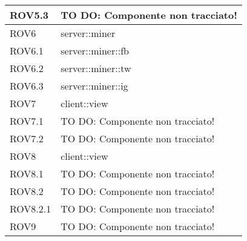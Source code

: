 \begin{center}
\begin{longtable}{| p{4cm} | p{8cm} |}
\hline
ROV5.3 & TO DO: Componente non tracciato! \\
\hline
ROV6 & server::miner \\
\hline
ROV6.1 & server::miner::fb \\
\hline
ROV6.2 & server::miner::tw \\
\hline
ROV6.3 & server::miner::ig \\
\hline
ROV7 & client::view \\
\hline
ROV7.1 & TO DO: Componente non tracciato! \\
\hline
ROV7.2 & TO DO: Componente non tracciato! \\
\hline
ROV8 & client::view \\
\hline
ROV8.1 & TO DO: Componente non tracciato! \\
\hline
ROV8.2 & TO DO: Componente non tracciato! \\
\hline
ROV8.2.1 & TO DO: Componente non tracciato! \\
\hline
ROV9 & TO DO: Componente non tracciato! \\
\hline
\end{longtable}
\egroup
\end{center}
